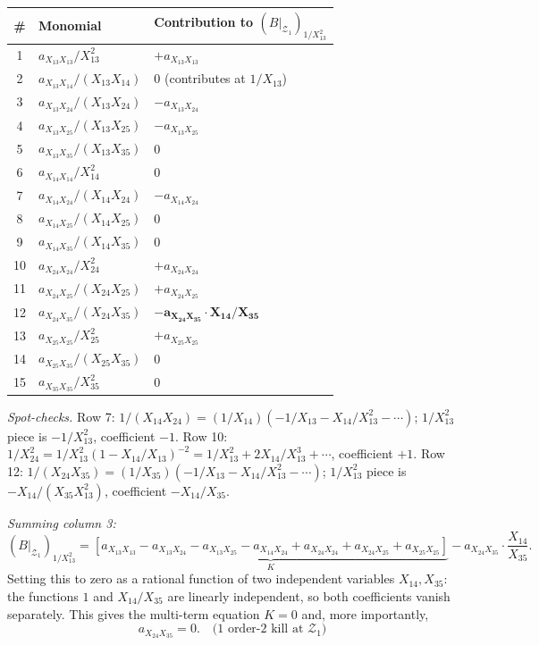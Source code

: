 \documentclass[11pt]{article}
\newcommand{\X}[2]{X_{#1#2}}
\newcommand{\Z}{\mathcal{Z}}
\theoremstyle{definition}
\begin{document}
\begin{center}
\renewcommand{\arraystretch}{1.15}
\begin{tabular}{c|l|l}
\toprule
\# & Monomial & Contribution to $(B|_{\Z_1})_{1/\X{1}{3}^2}$\\
\midrule
1 & $a_{\X{1}{3}\X{1}{3}}/\X{1}{3}^2$ & $+a_{\X{1}{3}\X{1}{3}}$ \\
2 & $a_{\X{1}{3}\X{1}{4}}/(\X{1}{3}\X{1}{4})$ & $0$ (contributes at $1/\X{1}{3}$)\\
3 & $a_{\X{1}{3}\X{2}{4}}/(\X{1}{3}\X{2}{4})$ & $-a_{\X{1}{3}\X{2}{4}}$\\
4 & $a_{\X{1}{3}\X{2}{5}}/(\X{1}{3}\X{2}{5})$ & $-a_{\X{1}{3}\X{2}{5}}$\\
5 & $a_{\X{1}{3}\X{3}{5}}/(\X{1}{3}\X{3}{5})$ & $0$\\
6 & $a_{\X{1}{4}\X{1}{4}}/\X{1}{4}^2$ & $0$\\
7 & $a_{\X{1}{4}\X{2}{4}}/(\X{1}{4}\X{2}{4})$ & $-a_{\X{1}{4}\X{2}{4}}$\\
8 & $a_{\X{1}{4}\X{2}{5}}/(\X{1}{4}\X{2}{5})$ & $0$\\
9 & $a_{\X{1}{4}\X{3}{5}}/(\X{1}{4}\X{3}{5})$ & $0$\\
10 & $a_{\X{2}{4}\X{2}{4}}/\X{2}{4}^2$ & $+a_{\X{2}{4}\X{2}{4}}$\\
11 & $a_{\X{2}{4}\X{2}{5}}/(\X{2}{4}\X{2}{5})$ & $+a_{\X{2}{4}\X{2}{5}}$\\
12 & $a_{\X{2}{4}\X{3}{5}}/(\X{2}{4}\X{3}{5})$ & $\boldsymbol{-a_{\X{2}{4}\X{3}{5}}\cdot\X{1}{4}/\X{3}{5}}$\\
13 & $a_{\X{2}{5}\X{2}{5}}/\X{2}{5}^2$ & $+a_{\X{2}{5}\X{2}{5}}$\\
14 & $a_{\X{2}{5}\X{3}{5}}/(\X{2}{5}\X{3}{5})$ & $0$\\
15 & $a_{\X{3}{5}\X{3}{5}}/\X{3}{5}^2$ & $0$\\
\bottomrule
\end{tabular}
\end{center}

\emph{Spot-checks.} Row 7: $1/(\X{1}{4}\X{2}{4}) = (1/\X{1}{4})(-1/\X{1}{3}-\X{1}{4}/\X{1}{3}^2-\cdots)$;
$1/\X{1}{3}^2$ piece is $-1/\X{1}{3}^2$, coefficient $-1$. Row 10:
$1/\X{2}{4}^2 = 1/\X{1}{3}^2(1-\X{1}{4}/\X{1}{3})^{-2} = 1/\X{1}{3}^2 + 2\X{1}{4}/\X{1}{3}^3 + \cdots$, coefficient $+1$.
Row 12: $1/(\X{2}{4}\X{3}{5}) = (1/\X{3}{5})(-1/\X{1}{3}-\X{1}{4}/\X{1}{3}^2-\cdots)$;
$1/\X{1}{3}^2$ piece is $-\X{1}{4}/(\X{3}{5}\X{1}{3}^2)$, coefficient $-\X{1}{4}/\X{3}{5}$.

\emph{Summing column 3:}
\[
(B|_{\Z_1})_{1/\X{1}{3}^2} = \underbrace{\left[a_{\X{1}{3}\X{1}{3}} - a_{\X{1}{3}\X{2}{4}} - a_{\X{1}{3}\X{2}{5}} - a_{\X{1}{4}\X{2}{4}} + a_{\X{2}{4}\X{2}{4}} + a_{\X{2}{4}\X{2}{5}} + a_{\X{2}{5}\X{2}{5}}\right]}_{K} - a_{\X{2}{4}\X{3}{5}}\cdot\frac{\X{1}{4}}{\X{3}{5}}.
\]
Setting this to zero as a rational function of two independent variables
$\X{1}{4}, \X{3}{5}$: the functions $1$ and $\X{1}{4}/\X{3}{5}$ are
linearly independent, so both coefficients vanish separately. This gives
the multi-term equation $K=0$ and, more importantly,
\[
\boxed{a_{\X{2}{4}\X{3}{5}}=0.}\quad\text{(1 order-2 kill at }\Z_1)
\]
\end{document}
